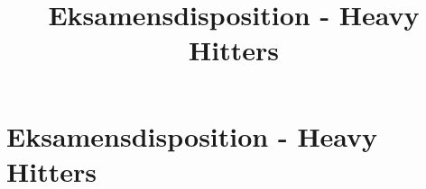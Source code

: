 
\title{Eksamensdisposition - Heavy Hitters}


\maketitle



\newpage
\section{Eksamensdisposition - Heavy Hitters}







